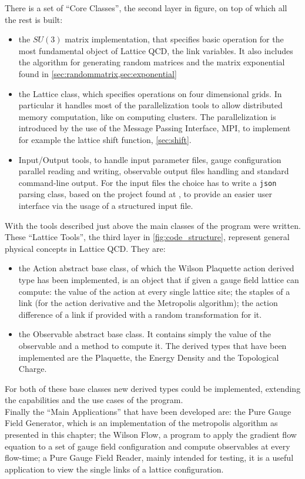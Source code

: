 
There is a set of ``Core Classes'', the second layer in figure, on top of which all the rest is built:
\begin{itemize} 
    \item the $SU(3)$ matrix implementation, that specifies basic operation for the most fundamental object of Lattice QCD, the link variables. It also includes the algorithm for generating random matrices and the matrix exponential found in \cref{sec:randommatrix,sec:exponential} 
    \item the Lattice class, which specifies operations on four dimensional grids. In particular it handles most of the parallelization tools to allow distributed memory computation, like on computing clusters. The parallelization is introduced by the use of the Message Passing Interface, MPI, to implement for example the lattice shift function, \cref{sec:shift}.
    \item Input/Output tools, to handle input parameter files, gauge configuration parallel reading and writing, observable output files handling and standard command-line output. For the input files the choice has to write a \texttt{json} parsing class, based on the project found at \cite{_nlohmann/json}, to provide an easier user interface via the usage of a  structured input file.
\end{itemize}

With the tools described just above the main classes of the program were written. These ``Lattice Tools'', the third layer in \cref{fig:code_structure}, represent general physical concepts in Lattice QCD. They are:
\begin{itemize}
    \item the Action abstract base class, of which the Wilson Plaquette action derived type has been implemented, is an object that if given a gauge field lattice can compute: the value of the action at every single lattice site; the staples of a link (for the action derivative and the Metropolis algorithm); the action difference of a link if provided with a random transformation for it.
    \item the Observable abstract base class. It contains simply the value of the observable and a method to compute it. The derived types that have been implemented are the Plaquette, the Energy Density and the Topological Charge.  
\end{itemize}
For both of these base classes new derived types could be implemented, extending the capabilities and the use cases of the program. \\
Finally the ``Main Applications'' that have been developed are: the Pure Gauge Field Generator, which is an implementation of the metropolis algorithm as presented in this chapter; the Wilson Flow, a program to apply the gradient flow equation to a set of gauge field configuration and compute observables at every flow-time; a Pure Gauge Field Reader, mainly intended for testing, it is a useful application to view the single links of a lattice configuration.